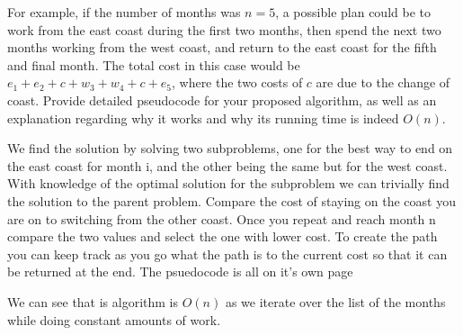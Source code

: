 \documentclass{article}
\begin{document}
For example, if the number of months was $n=5$, a possible plan could be to work from the east coast during
the first two months, then spend the next two months working from the west coast, and return to the east coast
for the fifth and final month. The total cost in this case would be $e_1+e_2+c+ w_3+w_4+c +e_5$, where the
two costs of $c$ are due to the change of coast. Provide detailed pseudocode for your proposed algorithm, as
well as an explanation regarding why it works and why its running time is indeed $O(n)$.

We find the solution by solving two subproblems, one for the best way to end on the east coast for month i, and the other being the same but for the west coast.
With knowledge of the optimal solution for the subproblem we can trivially find the solution to the parent problem.
Compare the cost of staying on the coast you are on to switching from the other coast.
Once you repeat and reach month n compare the two values and select the one with lower cost.
To create the path you can keep track as you go what the path is to the current cost so that it can be returned at the end.
\newline
\newline
The psuedocode is all on it's own page
\newline
\newline

We can see that is algorithm is $O(n)$ as we iterate over the list of the months while doing constant amounts of work.
\end{document}
